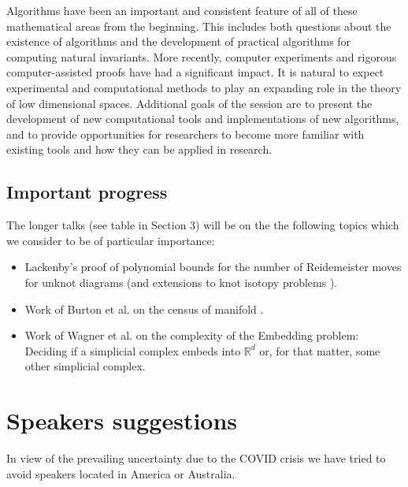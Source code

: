 \documentclass[12pt,fleqn]{article}
\begin{document}
Algorithms have been an important and consistent feature of all of these mathematical areas from the beginning. This includes both questions about the existence of algorithms and the development of practical algorithms for computing natural invariants. More recently, computer experiments and rigorous computer-assisted proofs have had a significant impact. It is natural to expect experimental and computational methods to play an expanding role in the theory of low dimensional spaces. Additional goals of the session are to present the development of new computational tools and implementations of new algorithms, and to provide opportunities for researchers to become more familiar with existing tools and how they can be applied in research.


\subsection{Important progress}

The longer talks (see table in Section 3) will be on the the following topics which we consider to be of particular importance:

\begin{itemize}


\item Lackenby's proof of polynomial bounds for the number of Reidemeister moves for unknot diagrams \cite{la1} (and extensions to knot isotopy problems \cite{la2}).


\item Work of Burton et al. on the census of manifold \cite{bu1,bu2}. 


\item  Work of Wagner et al. \cite{wa1,wa2} on the complexity of the Embedding problem: Deciding if a simplicial complex embeds into $\mathbb{R}^d$ or, for that matter, some other simplicial complex. 


\end{itemize}

\section{Speakers suggestions}

In view of the prevailing uncertainty due to the COVID crisis we have tried to avoid speakers located in America or Australia.
\end{document}
